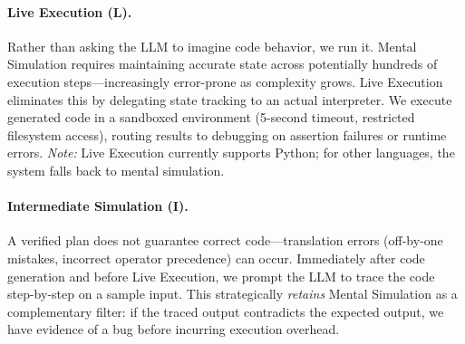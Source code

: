 \documentclass[11pt]{article}
\begin{document}
\paragraph{Live Execution (L).} Rather than asking the LLM to imagine code behavior, we run it. Mental Simulation requires maintaining accurate state across potentially hundreds of execution steps---increasingly error-prone as complexity grows. Live Execution eliminates this by delegating state tracking to an actual interpreter. We execute generated code in a sandboxed environment (5-second timeout, restricted filesystem access), routing results to debugging on assertion failures or runtime errors. \textit{Note:} Live Execution currently supports Python; for other languages, the system falls back to mental simulation.

\paragraph{Intermediate Simulation (I).} A verified plan does not guarantee correct code---translation errors (off-by-one mistakes, incorrect operator precedence) can occur. Immediately after code generation and before Live Execution, we prompt the LLM to trace the code step-by-step on a sample input. This strategically \textit{retains} Mental Simulation as a complementary filter: if the traced output contradicts the expected output, we have evidence of a bug before incurring execution overhead.

\end{document}
